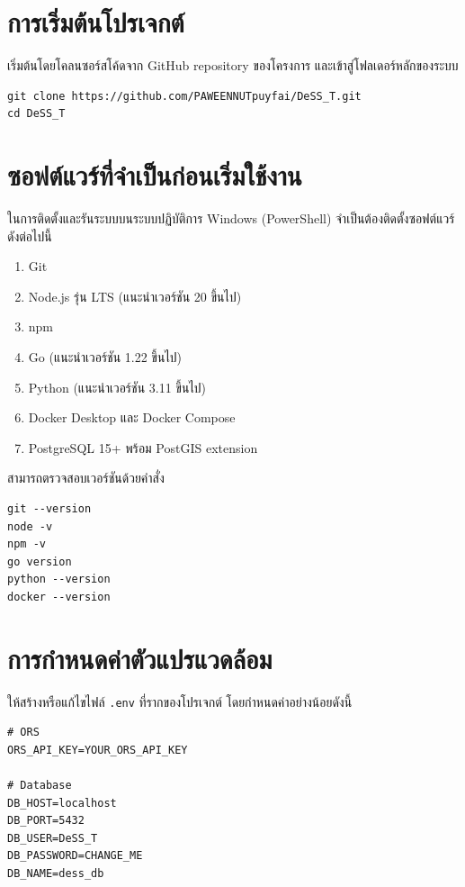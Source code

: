 \section{การเริ่มต้นโปรเจกต์}
\begin{mypara}
    \indent เริ่มต้นโดยโคลนซอร์สโค้ดจาก GitHub repository ของโครงการ และเข้าสู่โฟลเดอร์หลักของระบบ
\end{mypara}

\begin{verbatim}
git clone https://github.com/PAWEENNUTpuyfai/DeSS_T.git
cd DeSS_T
\end{verbatim}

\section{ซอฟต์แวร์ที่จำเป็นก่อนเริ่มใช้งาน}
\begin{mypara}
    \indent ในการติดตั้งและรันระบบบนระบบปฏิบัติการ Windows (PowerShell) จำเป็นต้องติดตั้งซอฟต์แวร์ดังต่อไปนี้
\end{mypara}

\begin{enumerate}
    \item Git
    \item Node.js รุ่น LTS (แนะนำเวอร์ชัน 20 ขึ้นไป)
    \item npm
    \item Go (แนะนำเวอร์ชัน 1.22 ขึ้นไป)
    \item Python (แนะนำเวอร์ชัน 3.11 ขึ้นไป)
    \item Docker Desktop และ Docker Compose
    \item PostgreSQL 15+ พร้อม PostGIS extension
\end{enumerate}

สามารถตรวจสอบเวอร์ชันด้วยคำสั่ง
\begin{verbatim}
git --version
node -v
npm -v
go version
python --version
docker --version
\end{verbatim}

\section{การกำหนดค่าตัวแปรแวดล้อม}
\begin{mypara}
    \indent ให้สร้างหรือแก้ไขไฟล์ \texttt{.env} ที่รากของโปรเจกต์ โดยกำหนดค่าอย่างน้อยดังนี้
\end{mypara}

\begin{verbatim}
# ORS
ORS_API_KEY=YOUR_ORS_API_KEY

# Database
DB_HOST=localhost
DB_PORT=5432
DB_USER=DeSS_T
DB_PASSWORD=CHANGE_ME
DB_NAME=dess_db
\end{verbatim}

